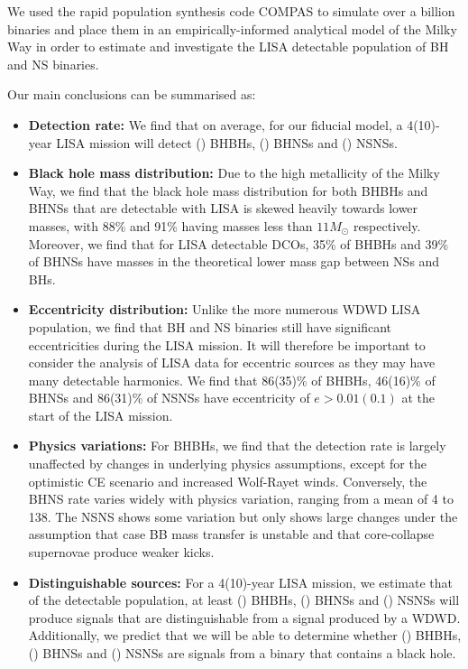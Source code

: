 We used the rapid population synthesis code COMPAS to simulate over a billion binaries and place them in an empirically-informed analytical model of the Milky Way in order to estimate and investigate the LISA detectable population of BH and NS binaries.

Our main conclusions can be summarised as:
\begin{itemize}
    \item \textbf{Detection rate:} We find that on average, for our fiducial model, a 4(10)-year LISA mission will detect \BHBHFourYear{}(\BHBHTenYear{}) BHBHs, \BHNSFourYear{}(\BHNSTenYear{}) BHNSs and \NSNSFourYear{}(\NSNSTenYear{}) NSNSs.
    \item \textbf{Black hole mass distribution:} Due to the high metallicity of the Milky Way, we find that the black hole mass distribution for both BHBHs and BHNSs that are detectable with LISA is skewed heavily towards lower masses, with 88\% and 91\% having masses less than $11 \unit{M_\odot}$ respectively. Moreover, we find that for LISA detectable DCOs, 35\% of BHBHs and 39\% of BHNSs have masses in the theoretical lower mass gap between NSs and BHs.
    \item \textbf{Eccentricity distribution:} Unlike the more numerous WDWD LISA population, we find that BH and NS binaries still have significant eccentricities during the LISA mission. It will therefore be important to consider the analysis of LISA data for eccentric sources as they may have many detectable harmonics. We find that 86(35)\% of BHBHs, 46(16)\% of BHNSs and 86(31)\% of NSNSs have eccentricity of $e > 0.01(0.1)$ at the start of the LISA mission.
    \item \textbf{Physics variations:} For BHBHs, we find that the detection rate is largely unaffected by changes in underlying physics assumptions, except for the optimistic CE scenario and increased Wolf-Rayet winds. Conversely, the BHNS rate varies widely with physics variation, ranging from a mean of 4 to 138. The NSNS shows some variation but only shows large changes under the assumption that case BB mass transfer is unstable and that core-collapse supernovae produce weaker kicks.
    \item \textbf{Distinguishable sources:} For a 4(10)-year LISA mission, we estimate that of the detectable population, at least \BHBHNotWDWDFour{}(\BHBHNotWDWDTen{}) BHBHs, \BHNSNotWDWDFour{}(\BHNSNotWDWDTen{}) BHNSs and \NSNSNotWDWDFour{}(\NSNSNotWDWDTen{}) NSNSs will produce signals that are distinguishable from a signal produced by a WDWD. Additionally, we predict that we will be able to determine whether \BHBHDistinguishedFour{}(\BHBHDistinguishedTen{}) BHBHs, \BHNSDistinguishedFour{}(\BHNSDistinguishedTen{}) BHNSs and \NSNSDistinguishedFour{}(\NSNSDistinguishedTen{}) NSNSs are signals from a binary that contains a black hole.

\end{itemize}
